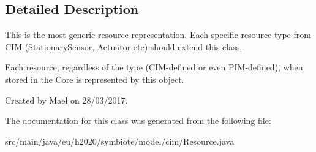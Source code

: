 \subsection{Detailed Description}
This is the most generic resource representation. Each specific resource type from C\+IM (\hyperlink{classeu_1_1h2020_1_1symbiote_1_1model_1_1cim_1_1StationarySensor}{Stationary\+Sensor}, \hyperlink{classeu_1_1h2020_1_1symbiote_1_1model_1_1cim_1_1Actuator}{Actuator} etc) should extend this class. 

Each resource, regardless of the type (C\+I\+M-\/defined or even P\+I\+M-\/defined), when stored in the Core is represented by this object. 

Created by Mael on 28/03/2017. 

The documentation for this class was generated from the following file\+:\begin{DoxyCompactItemize}
\item 
src/main/java/eu/h2020/symbiote/model/cim/Resource.\+java\end{DoxyCompactItemize}
